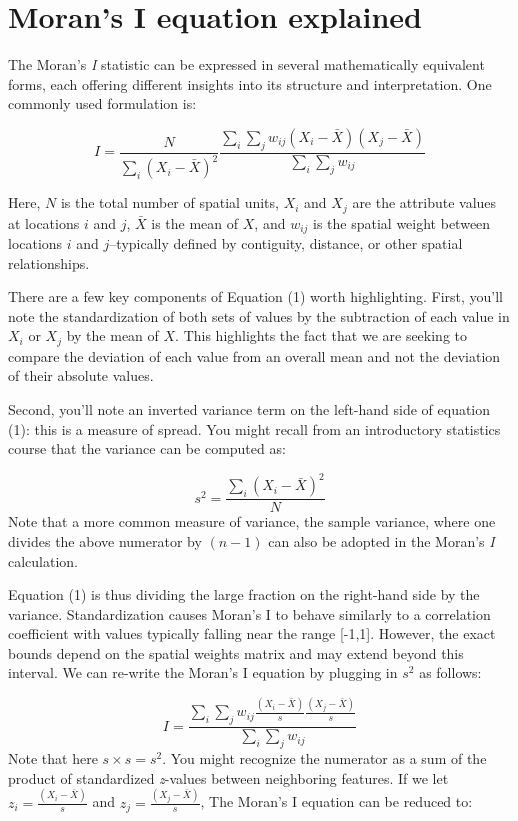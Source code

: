 \documentclass[
  letterpaper,
]{book}
\begin{document}
\section{Moran's I equation
explained}\label{morans-i-equation-explained}

The Moran's \emph{I} statistic can be expressed in several
mathematically equivalent forms, each offering different insights into
its structure and interpretation. One commonly used formulation is:

\[
I = \frac{N}{\sum\limits_i (X_i-\bar X)^2} 
    \frac{\sum\limits_i \sum\limits_j w_{ij}(X_i-\bar X)(X_j-\bar X)}{\sum\limits_i \sum\limits_j w_{ij}} \tag{1}
\]

Here, \(N\) is the total number of spatial units, \(X_i\) and \(X_j\)
are the attribute values at locations \(i\) and \(j\), \(\bar{X}\) is
the mean of \(X\), and \(w_{ij}\) is the spatial weight between
locations \(i\) and \(j\)--typically defined by contiguity, distance, or
other spatial relationships.

There are a few key components of Equation (1) worth highlighting.
First, you'll note the standardization of both sets of values by the
subtraction of each value in \(X_i\) or \(X_j\) by the mean of \(X\).
This highlights the fact that we are seeking to compare the deviation of
each value from an overall mean and not the deviation of their absolute
values.

Second, you'll note an inverted variance term on the left-hand side of
equation (1): this is a measure of spread. You might recall from an
introductory statistics course that the variance can be computed as:

\[
s^2 = \frac{\sum\limits_i (X_i-\bar X)^2}{N}\tag{2}
\] Note that a more common measure of variance, the sample variance,
where one divides the above numerator by \((n-1)\) can also be adopted
in the Moran's \emph{I} calculation.

Equation (1) is thus dividing the large fraction on the right-hand side
by the variance. Standardization causes Moran's I to behave similarly to
a correlation coefficient with values typically falling near the range
{[}-1,1{]}. However, the exact bounds depend on the spatial weights
matrix and may extend beyond this interval. We can re-write the Moran's
I equation by plugging in \(s^2\) as follows:

\[
I = \frac{\sum\limits_i \sum\limits_j w_{ij}\frac{(X_i-\bar X)}{s}\frac{(X_j-\bar X)}{s}}{\sum\limits_i \sum\limits_j w_{ij}} \tag{3}
\] Note that here \(s\times s = s^2\). You might recognize the numerator
as a sum of the product of standardized \emph{z}-values between
neighboring features. If we let \(z_i = \frac{(X_i-\bar X)}{s}\) and
\(z_j = \frac{(X_j-\bar X)}{s}\), The Moran's I equation can be reduced
to:
\end{document}
